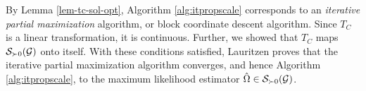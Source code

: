 By Lemma \ref{lem-tc-sol-opt}, Algorithm \ref{alg:itpropscale} corresponds to an \textit{iterative partial maximization} algorithm, or block coordinate descent algorithm. Since $T_C$ is a linear transformation, it is continuous. Further, we showed that $T_C$ maps ${\mathcal{S}}_{\succ 0}({\mathcal{G}})$ onto itself. With these conditions satisfied, Lauritzen \cite[Proposition A.3]{lauritzen1996} proves that the iterative partial maximization algorithm converges, and hence Algorithm \ref{alg:itpropscale}, to the maximum likelihood estimator $\hat\Omega \in {\mathcal{S}}_{\succ 0}({\mathcal{G}})$.